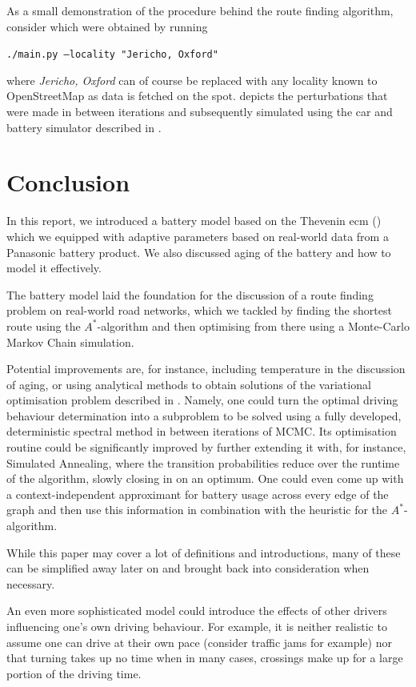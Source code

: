 \documentclass{prettytex/ox/mmsc-special-topic}
\begin{document}
  As a small demonstration of the procedure behind the route finding algorithm, consider  which were obtained by running \\
  \centerline{\texttt{./main.py --locality "Jericho, Oxford"}}
  where \textit{Jericho, Oxford} can of course be replaced with any locality known to OpenStreetMap as data is fetched on the spot.
   depicts the perturbations that were made in between iterations and subsequently simulated using the car and battery simulator described in .

  \section{Conclusion}
  \label{sec:discussion}
  In this report, we introduced a battery model based on the Thevenin \gls{ecm} () which we equipped with adaptive parameters based on real-world data from a Panasonic battery product.
  We also discussed aging of the battery and how to model it effectively.

  The battery model laid the foundation for the discussion of a route finding problem on real-world road networks, which we tackled by finding the shortest route using the $A^*$-algorithm and then optimising from there using a Monte-Carlo Markov Chain simulation.

  Potential improvements are, for instance, including temperature in the discussion of aging, or using analytical methods to obtain solutions of the variational optimisation problem described in .
  Namely, one could turn the optimal driving behaviour determination into a subproblem to be solved using a fully developed, deterministic spectral method in between iterations of MCMC.
  Its optimisation routine could be significantly improved by further extending it with, for instance, Simulated Annealing, where the transition probabilities reduce over the runtime of the algorithm, slowly closing in on an optimum.
  One could even come up with a context-independent approximant for battery usage across every edge of the graph and then use this information in combination with the heuristic for the $A^*$-algorithm.

  While this paper may cover a lot of definitions and introductions, many of these can be simplified away later on and brought back into consideration when necessary.

  An even more sophisticated model could introduce the effects of other drivers influencing one's own driving behaviour.
  For example, it is neither realistic to assume one can drive at their own pace (consider traffic jams for example) nor that turning takes up no time when in many cases, crossings make up for a large portion of the driving time.
\end{document}
